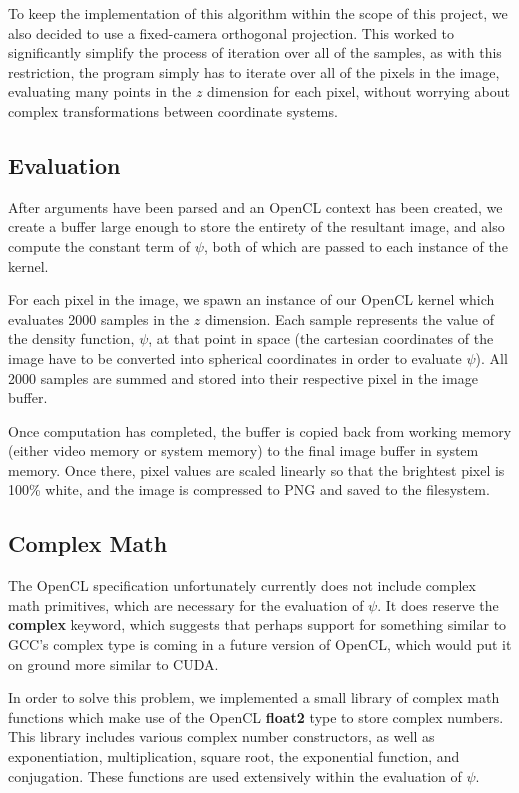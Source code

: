 \documentclass{acmsiggraph}
\begin{document}
To keep the implementation of this algorithm within the scope of this project, we also decided to use a fixed-camera orthogonal projection. This worked to significantly simplify the process of iteration over all of the samples, as with this restriction, the program simply has to iterate over all of the pixels in the image, evaluating many points in the $z$ dimension for each pixel, without worrying about complex transformations between coordinate systems.

\subsection{Evaluation}

After arguments have been parsed and an OpenCL context has been created, we create a buffer large enough to store the entirety of the resultant image, and also compute the constant term of $\psi$, both of which are passed to each instance of the kernel.

For each pixel in the image, we spawn an instance of our OpenCL kernel which evaluates 2000 samples in the $z$ dimension. Each sample represents the value of the density function, $\psi$, at that point in space (the cartesian coordinates of the image have to be converted into spherical coordinates in order to evaluate $\psi$). All 2000 samples are summed and stored into their respective pixel in the image buffer.

Once computation has completed, the buffer is copied back from working memory (either video memory or system memory) to the final image buffer in system memory. Once there, pixel values are scaled linearly so that the brightest pixel is 100\% white, and the image is compressed to PNG and saved to the filesystem.

\subsection{Complex Math}

The OpenCL specification unfortunately currently does not include complex math primitives, which are necessary for the evaluation of $\psi$. It does reserve the {\bf complex} keyword, which suggests that perhaps support for something similar to GCC's complex type is coming in a future version of OpenCL, which would put it on ground more similar to CUDA.

In order to solve this problem, we implemented a small library of complex math functions which make use of the OpenCL {\bf float2} type to store complex numbers. This library includes various complex number constructors, as well as exponentiation, multiplication, square root, the exponential function, and conjugation. These functions are used extensively within the evaluation of $\psi$.
\end{document}
